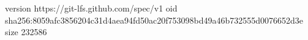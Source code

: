 version https://git-lfs.github.com/spec/v1
oid sha256:8059afc3856204c31d4aea94fd50ac20f753098bd49a46b732555d0076652d3e
size 232586
